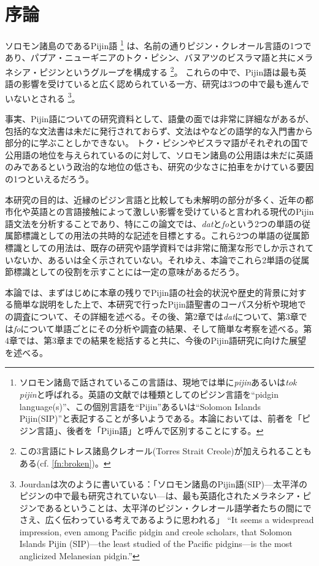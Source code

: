 \chapter{序論}

ソロモン諸島のであるPijin語
\footnote{
ソロモン諸島で話されているこの言語は、現地では単に\textit{pijin}あるいは\textit{tok pijin}と呼ばれる。英語の文献では種類としてのピジン言語を``pidgin language(s)''、この個別言語を``Pijin''あるいは``Solomon Islands Pijin(SIP)''と表記することが多いようである。本論においては、前者を「ピジン言語」、後者を「Pijin語」と呼んで区別することにする。}
は、名前の通りピジン・クレオール言語の1つであり、パプア・ニューギニアのトク・ピシン、バヌアツのビスラマ語と共にメラネシア・ピジンというグループを構成する
\footnote{
この3言語にトレス諸島クレオール(Torres Strait Creole)が加えられることもある(cf. \ref{fn:broken})。
}。
これらの中で、Pijin語は最も英語の影響を受けていると広く認められている一方、研究は3つの中で最も進んでいないとされる
\footnote{
Jourdanは次のように書いている：「ソロモン諸島のPijin語(SIP)---太平洋のピジンの中で最も研究されていない---は、最も英語化されたメラネシア・ピジンであるということは、太平洋のピジン・クレオール語学者たちの間にでさえ、広く伝わっている考えであるように思われる」
  ``It seems a widespread impression, even among Pacific pidgin and creole scholars, that Solomon Islands Pijin (SIP)---the least studied of the Pacific pidgins---is the most anglicized Melanesian pidgin.''\citep{nativization}
}。

事実、Pijin語についての研究資料として、語彙の面では非常に詳細な\cite{dictionary}があるが、包括的な文法書は未だに発行されておらず\citep{phonology}、文法は\cite{yumi}や\cite{eric}などの語学的な入門書から部分的に学ぶことしかできない。
トク・ピシンやビスラマ語がそれぞれの国で公用語の地位を与えられているのに対して、ソロモン諸島の公用語は未だに英語のみであるという政治的な地位の低さも、研究の少なさに拍車をかけている要因の1つといえるだろう。

本研究の目的は、近縁のピジン言語と比較しても未解明の部分が多く、近年の都市化や英語との言語接触によって激しい影響を受けていると言われる現代のPijin語文法を分析することであり、特にこの論文では、\textit{dat}と\textit{fo}という2つの単語の従属節標識としての用法の共時的な記述を目標とする。これら2つの単語の従属節標識としての用法は、既存の研究や語学資料では非常に簡潔な形でしか示されていないか、あるいは全く示されていない。それゆえ、本論でこれら2単語の従属節標識としての役割を示すことには一定の意味があるだろう。

本論では、まずはじめに本章の残りでPijin語の社会的状況や歴史的背景に対する簡単な説明をした上で、本研究で行ったPijin語聖書のコーパス分析や現地での調査について、その詳細を述べる。その後、第2章では\textit{dat}について、第3章では\textit{fo}について単語ごとにその分析や調査の結果、そして簡単な考察を述べる。第4章では、第3章までの結果を総括すると共に、今後のPijin語研究に向けた展望を述べる。

